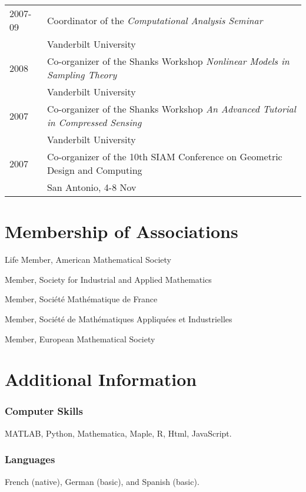 \documentclass[11pt]{article}
\begin{document}
\begin{tabular}{ll}
2007-09 & Coordinator of the {\sl Computational Analysis Seminar}\\
& Vanderbilt University\\
2008 & Co-organizer of the Shanks Workshop {\sl Nonlinear Models in Sampling Theory}\\
& Vanderbilt University\\
2007 & Co-organizer of the Shanks Workshop {\sl An Advanced Tutorial in Compressed Sensing}\\
& Vanderbilt University\\
2007 &  Co-organizer of the 10th SIAM Conference on Geometric Design and Computing\\
& San Antonio, 4-8 Nov
\end{tabular}



\section{Membership of Associations}

\bitemize
\item Life Member, American Mathematical Society
\item Member, Society for Industrial and Applied Mathematics
\item Member, Soci\'{e}t\'{e} Math\'{e}matique de France
\item Member, Soci\'et\'e de Math\'ematiques Appliqu\'ees et Industrielles
\item Member, European Mathematical Society
\eitemize


\section{Additional Information}

\subsubsection{Computer Skills} 
MATLAB, Python, Mathematica, Maple, R, Html, JavaScript.

\subsubsection{Languages}
French (native), German (basic), and Spanish (basic).
\end{document}
